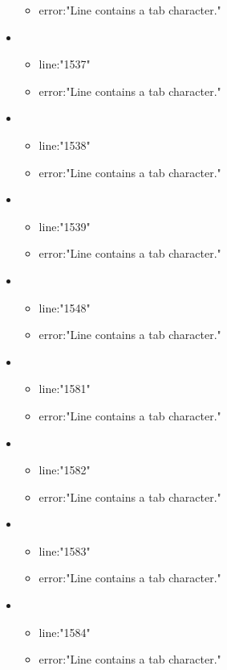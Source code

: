 \begin{itemize}
\begin{itemize}
		\item error:"Line contains a tab character." 
	\end{itemize}
	\item 
	\begin{itemize} 
		\item line:"1537" 
		\item error:"Line contains a tab character." 
	\end{itemize}
	\item 
	\begin{itemize} 
		\item line:"1538" 
		\item error:"Line contains a tab character." 
	\end{itemize}
	\item 
	\begin{itemize} 
		\item line:"1539" 
		\item error:"Line contains a tab character." 
	\end{itemize}
	\item 
	\begin{itemize} 
		\item line:"1548" 
		\item error:"Line contains a tab character." 
	\end{itemize}
	\item 
	\begin{itemize} 
		\item line:"1581" 
		\item error:"Line contains a tab character." 
	\end{itemize}
	\item 
	\begin{itemize} 
		\item line:"1582" 
		\item error:"Line contains a tab character." 
	\end{itemize}
	\item 
	\begin{itemize} 
		\item line:"1583" 
		\item error:"Line contains a tab character." 
	\end{itemize}
	\item 
	\begin{itemize} 
		\item line:"1584" 
		\item error:"Line contains a tab character." 
	\end{itemize}

\end{itemize}
